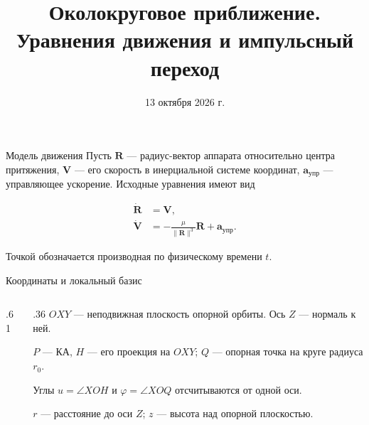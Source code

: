\documentclass[11pt,aspectratio=169,t]{beamer}
\title{Околокруговое приближение.\\Уравнения движения и импульсный переход}
\date{13 октября 2026 г.}
\begin{document}
\newcommand{\derivationmathspacing}{%
  \setlength{\abovedisplayskip}{2pt}%
  \setlength{\belowdisplayskip}{3pt}%
  \setlength{\abovedisplayshortskip}{2pt}%
  \setlength{\belowdisplayshortskip}{2pt}%
  \setlength{\jot}{2pt}}

\begin{frame}[plain]
\titlepage
\end{frame}

\begin{frame}{Модель движения}
\relax
\justifying
Пусть $\boldsymbol R$ --- радиус-вектор аппарата относительно центра
притяжения, $\boldsymbol V$ --- его скорость в инерциальной системе
координат, $\boldsymbol a_{\text{упр}}$ --- управляющее ускорение.
Исходные уравнения имеют вид
\par\medskip
\derivationmathspacing
\[
\boxed{\begin{aligned}
 \dot{\boldsymbol R}&=\boldsymbol V,\\[5pt]
 \dot{\boldsymbol V}&=-\frac{\mu}{\|\boldsymbol R\|^3}\boldsymbol R
                  +\boldsymbol a_{\text{упр}}.
\end{aligned}}
\]
\par\medskip
Точкой обозначается производная по физическому времени $t$.
\end{frame}

\begin{frame}{Координаты и локальный базис}
\relax
\begin{columns}[T,onlytextwidth]
\begin{column}{.61\textwidth}
\centering
\resizebox{\linewidth}{!}{}
\end{column}
\begin{column}{.36\textwidth}
\RaggedRight
$OXY$ — неподвижная плоскость опорной орбиты. Ось $Z$ — нормаль к ней.\par\medskip
$P$ — КА, $H$ — его проекция на $OXY$; $Q$ — опорная точка на круге радиуса $r_0$.\par\medskip
Углы $u=\angle XOH$ и $\varphi=\angle XOQ$ отсчитываются от одной оси.\par\medskip
$r$ — расстояние до оси $Z$; $z$ — высота над опорной плоскостью.
\end{column}
\end{columns}
\end{frame}
\end{document}
